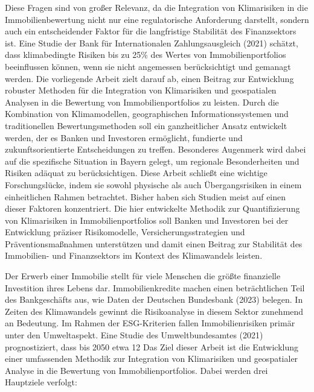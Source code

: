 Diese Fragen sind von großer Relevanz, da die Integration von Klimarisiken in die Immobilienbewertung nicht nur eine regulatorische Anforderung darstellt, sondern auch ein entscheidender Faktor für die langfristige Stabilität des Finanzsektors ist. Eine Studie der Bank für Internationalen Zahlungsausgleich (2021) schätzt, dass klimabedingte Risiken bis zu 25\% des Wertes von Immobilienportfolios beeinflussen können, wenn sie nicht angemessen berücksichtigt und gemanagt werden.
Die vorliegende Arbeit zielt darauf ab, einen Beitrag zur Entwicklung robuster Methoden für die Integration von Klimarisiken und geospatialen Analysen in die Bewertung von Immobilienportfolios zu leisten. Durch die Kombination von Klimamodellen, geographischen Informationssystemen und traditionellen Bewertungsmethoden soll ein ganzheitlicher Ansatz entwickelt werden, der es Banken und Investoren ermöglicht, fundierte und zukunftsorientierte Entscheidungen zu treffen. Besonderes Augenmerk wird dabei auf die spezifische Situation in Bayern gelegt, um regionale Besonderheiten und Risiken adäquat zu berücksichtigen.
Diese Arbeit schließt eine wichtige Forschungslücke, indem sie sowohl physische als auch Übergangsrisiken in einem einheitlichen Rahmen betrachtet. Bisher haben sich Studien meist auf einen dieser Faktoren konzentriert. Die hier entwickelte Methodik zur Quantifizierung von Klimarisiken in Immobilienportfolios soll Banken und Investoren bei der Entwicklung präziser Risikomodelle, Versicherungsstrategien und Präventionsmaßnahmen unterstützen und damit einen Beitrag zur Stabilität des Immobilien- und Finanzsektors im Kontext des Klimawandels leisten.

Der Erwerb einer Immobilie stellt für viele Menschen die größte finanzielle Investition ihres Lebens dar. Immobilienkredite machen einen beträchtlichen Teil des Bankgeschäfts aus, wie Daten der Deutschen Bundesbank (2023) belegen. In Zeiten des Klimawandels gewinnt die Risikoanalyse in diesem Sektor zunehmend an Bedeutung.
Im Rahmen der ESG-Kriterien fallen Immobilienrisiken primär unter den Umweltaspekt. Eine Studie des Umweltbundesamtes (2021) prognostiziert, dass bis 2050 etwa 12%
Das Ziel dieser Arbeit ist die Entwicklung einer umfassenden Methodik zur Integration von Klimarisiken und geospatialer Analyse in die Bewertung von Immobilienportfolios. Dabei werden drei Hauptziele verfolgt:

